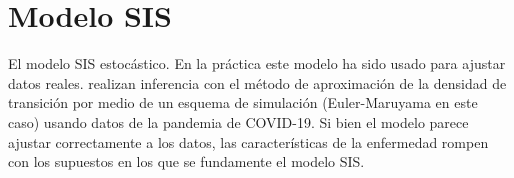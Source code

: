 \section{Modelo SIS}

El modelo SIS estocástico. En la práctica este modelo 
ha sido usado para ajustar datos reales. 
\textcite{ozdemircalikusuFittingItoStochastic2021} realizan
inferencia con el método de aproximación de la densidad
de transición por medio de un esquema de simulación
(Euler-Maruyama en este caso) usando datos de la pandemia
de COVID-19. Si bien el modelo parece ajustar correctamente
a los datos, las características de la enfermedad rompen 
con los supuestos en los que se fundamente el modelo SIS.